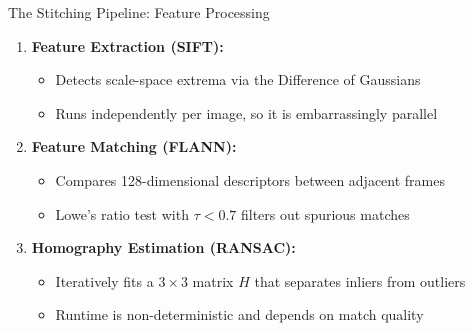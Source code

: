 \documentclass{beamer}
\begin{document}
\begin{frame}{The Stitching Pipeline: Feature Processing}
  \begin{enumerate}
    \item \textbf{Feature Extraction (SIFT):}
      \begin{itemize}
        \item Detects scale-space extrema via the Difference of Gaussians
        \item Runs independently per image, so it is embarrassingly parallel
      \end{itemize}
    \item \textbf{Feature Matching (FLANN):}
      \begin{itemize}
        \item Compares 128-dimensional descriptors between adjacent frames
        \item Lowe's ratio test with $\tau < 0.7$ filters out spurious matches
      \end{itemize}
    \item \textbf{Homography Estimation (RANSAC):}
      \begin{itemize}
        \item Iteratively fits a $3\times3$ matrix $H$ that separates inliers from outliers
        \item Runtime is non-deterministic and depends on match quality
      \end{itemize}
  \end{enumerate}
\end{frame}
\end{document}
